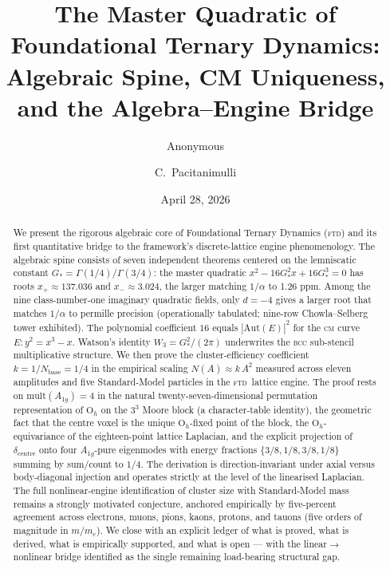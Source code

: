 \documentclass[11pt,reqno]{amsart}
\title[The Master Quadratic of FTD]{The Master Quadratic of Foundational Ternary Dynamics:\\
  Algebraic Spine, CM Uniqueness,\\
  and the Algebra--Engine Bridge}
\author{Anonymous}
\author{C.\ Pacitanimulli}
\date{April 28, 2026}
\theoremstyle{plain}
\theoremstyle{definition}
\theoremstyle{remark}
\numberwithin{equation}{section}
\newcommand{\Ohgrp}{\mathrm{O}_h}
\newcommand{\Aoneg}{A_{1g}}
\newcommand{\Gstar}{G_{\!*}}
\newcommand{\Nbase}{N_{\mathrm{base}}}
\newcommand{\FTD}{\textsc{ftd}}
\begin{document}
\begin{abstract}
We present the rigorous algebraic core of Foundational Ternary
Dynamics (\FTD) and its first quantitative bridge to the framework's
discrete-lattice engine phenomenology. The algebraic spine consists of
seven independent theorems centered on the lemniscatic constant
$\Gstar = \Gamma(1/4)/\Gamma(3/4)$: the master quadratic
$x^2 - 16\Gstar^{2}x + 16\Gstar^{3}=0$ has roots
$x_{+} \approx 137.036$ and $x_{-} \approx 3.024$, the larger matching
$1/\alpha$ to 1.26 ppm. Among the nine class-number-one imaginary
quadratic fields, only $d=-4$ gives a larger root that matches
$1/\alpha$ to permille precision (operationally tabulated; nine-row Chowla--Selberg tower exhibited).
The polynomial coefficient $16$ equals $|\mathrm{Aut}(E)|^{2}$ for the
\textsc{cm} curve $E\colon y^{2}=x^{3}-x$. Watson's identity
$W_{3} = \Gstar^{2}/(2\pi)$ underwrites the \textsc{bcc} sub-stencil
multiplicative structure. We then prove the cluster-efficiency
coefficient $k = 1/\Nbase = 1/4$ in the empirical scaling
$N(A) \approx k\,A^{2}$ measured across eleven amplitudes and five
Standard-Model particles in the \FTD\ lattice engine. The proof rests
on $\mathrm{mult}(\Aoneg) = 4$ in the natural twenty-seven-dimensional
permutation representation of $\Ohgrp$ on the $3^{3}$ Moore block (a
character-table identity), the geometric fact that the centre voxel is
the unique $\Ohgrp$-fixed point of the block, the
$\Ohgrp$-equivariance of the eighteen-point lattice Laplacian, and the
explicit projection of $\delta_{\mathrm{centre}}$ onto four
$\Aoneg$-pure eigenmodes with energy fractions
$\{3/8, 1/8, 3/8, 1/8\}$ summing by sum/count to $1/4$. The derivation
is direction-invariant under axial versus body-diagonal injection and
operates strictly at the level of the linearised Laplacian. The full
nonlinear-engine identification of cluster size with Standard-Model
mass remains a strongly motivated conjecture, anchored empirically by
five-percent agreement across electrons, muons, pions, kaons, protons,
and tauons (five orders of magnitude in $m/m_{e}$). We close with an
explicit ledger of what is proved, what is derived, what is
empirically supported, and what is open --- with the linear$\to$nonlinear
bridge identified as the single remaining load-bearing structural gap.
\end{abstract}

\maketitle
\end{document}
